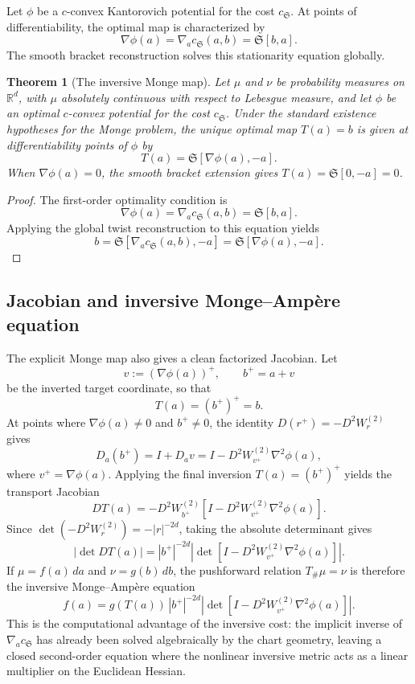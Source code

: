 \documentclass[11pt]{article}
\newtheorem{theorem}{Theorem}[section]
\newcommand{\R}{\mathbb{R}}
\newcommand{\norm}[1]{\left|#1\right|}
\newcommand{\push}{\#}
\newcommand{\cs}{c_{\mathfrak S}}
\newcommand{\grad}{\nabla}
\newcommand{\Sbr}[2]{\mathfrak S[#1,#2]}
\begin{document}
Let $\phi$ be a $c$-convex Kantorovich potential for the cost $\cs$.  At points of differentiability, the optimal map is characterized by
\[
    \grad\phi(a)=\grad_a\cs(a,b)=\Sbr{b}{a}.
\]
The smooth bracket reconstruction solves this stationarity equation globally.

\begin{theorem}[The inversive Monge map]
Let $\mu$ and $\nu$ be probability measures on $\R^d$, with $\mu$ absolutely continuous with respect to Lebesgue measure, and let $\phi$ be an optimal $c$-convex potential for the cost $\cs$.  Under the standard existence hypotheses for the Monge problem, the unique optimal map $T(a)=b$ is given at differentiability points of $\phi$ by
\[
    \boxed{
    T(a)=\Sbr{\grad\phi(a)}{-a}.
    }
\]
When $\grad\phi(a)=0$, the smooth bracket extension gives $T(a)=\Sbr{0}{-a}=0$.
\end{theorem}

\begin{proof}
The first-order optimality condition is
\[
    \grad\phi(a)=\grad_a\cs(a,b)=\Sbr{b}{a}.
\]
Applying the global twist reconstruction to this equation yields
\[
    b=\Sbr{\grad_a\cs(a,b)}{-a}=\Sbr{\grad\phi(a)}{-a}.
\]
\end{proof}

\subsection{Jacobian and inversive Monge--Amp\`ere equation}

The explicit Monge map also gives a clean factorized Jacobian.  Let
\[
    v:=(\grad\phi(a))^+,
    \qquad
    b^+=a+v
\]
be the inverted target coordinate, so that
\[
    T(a)=(b^+)^+=b.
\]
At points where $\grad\phi(a)\neq0$ and $b^+\neq0$, the identity $D(r^+)=-D^2W^{(2)}_r$ gives
\[
    D_a(b^+)
    =
    I+D_av
    =
    I-D^2W^{(2)}_{v^+}\nabla^2\phi(a),
\]
where $v^+=\grad\phi(a)$.
Applying the final inversion $T(a)=(b^+)^+$ yields the transport Jacobian
\[
    \boxed{
    DT(a)
    =
    -D^2W^{(2)}_{b^+}
    \left[
        I-D^2W^{(2)}_{v^+}\nabla^2\phi(a)
    \right].
    }
\]
Since $\det(-D^2W^{(2)}_r)=-\norm r^{-2d}$, taking the absolute determinant gives
\[
    |\det DT(a)|
    =
    \norm{b^+}^{-2d}
    \left|
    \det\left[
        I-D^2W^{(2)}_{v^+}\nabla^2\phi(a)
    \right]
    \right|.
\]
If $\mu=f(a)\,da$ and $\nu=g(b)\,db$, the pushforward relation $T_\push\mu=\nu$ is therefore the inversive Monge--Amp\`ere equation
\[
    \boxed{
    f(a)
    =
    g(T(a))\,
    \norm{b^+}^{-2d}
    \left|
    \det\left[
        I-D^2W^{(2)}_{v^+}\nabla^2\phi(a)
    \right]
    \right|.
    }
\]
This is the computational advantage of the inversive cost: the implicit inverse of $\grad_a\cs$ has already been solved algebraically by the chart geometry, leaving a closed second-order equation where the nonlinear inversive metric acts as a linear multiplier on the Euclidean Hessian.
\end{document}
